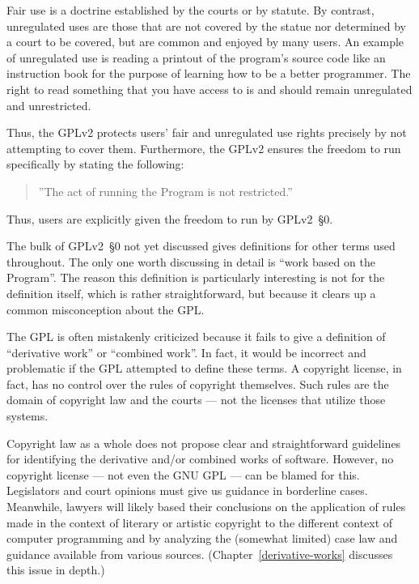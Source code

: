 Fair use is a doctrine established by the courts or by statute.  By
contrast, unregulated uses are those that are not covered by the statue
nor determined by a court to be covered, but are common and enjoyed by
many users.  An example of unregulated use is reading a printout of the
program's source code like an instruction book for the purpose of learning
how to be a better programmer.  The right to read something that you have
access to is and should remain unregulated and unrestricted.

\medskip

Thus, the GPLv2 protects users' fair and unregulated use rights precisely by
not attempting to cover them.  Furthermore, the GPLv2 ensures the freedom
to run specifically by stating the following:
\begin{quote}
''The act of running the Program is not restricted.''
\end{quote}
Thus, users are explicitly given the freedom to run by GPLv2~\S0.

\medskip

The bulk of GPLv2~\S0 not yet discussed gives definitions for other terms used
throughout.  The only one worth discussing in detail is ``work based on
the Program''.  The reason this definition is particularly interesting is
not for the definition itself, which is rather straightforward, but
because it clears up a common misconception about the GPL\@.

The GPL is often mistakenly criticized because it fails to give a
definition of ``derivative work'' or ``combined work''.  In fact, it would be incorrect and
problematic if the GPL attempted to define these terms.  A copyright license, in
fact, has no control over the rules of copyright themselves.  Such rules are
the domain of copyright law and the courts --- not the licenses that utilize
those systems.

Copyright law as a whole does not propose clear and straightforward guidelines
for identifying the derivative and/or combined works of software.  However,
no copyright license --- not even the GNU GPL --- can be blamed for this.
Legislators and court opinions must give us guidance in borderline cases.
Meanwhile, lawyers will likely based their conclusions on the application of rules
made in the context of literary or artistic copyright to the different
context of computer programming and by analyzing the (somewhat limited) case
law and guidance available from various sources.
(Chapter~\ref{derivative-works} discusses this issue in depth.)


